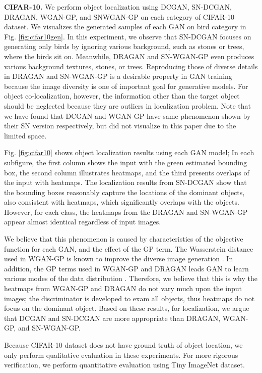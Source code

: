 \documentclass[runningheads]{llncs}
\begin{document}
\noindent\textbf{CIFAR-10.} We perform object localization using DCGAN, SN-DCGAN, DRAGAN, WGAN-GP, and SNWGAN-GP on each category of CIFAR-10 dataset. We visualizes the generated samples of each GAN on bird category in Fig. \ref{fig:cifar10gen}. In this experiment, we observe that SN-DCGAN focuses on generating only birds by ignoring various background, such as stones or trees, where the birds sit on. Meanwhile, DRAGAN and SN-WGAN-GP even produces various background textures, stones, or trees. Reproducing those of diverse details in DRAGAN and SN-WGAN-GP is a desirable property in GAN training because the image diversity is one of important goal for generative models. For object co-localization, however, the information other than the target object should be neglected because they are outliers in localization problem. Note that we have found that DCGAN and WGAN-GP have same phenomenon shown by their SN version respectively, but did not visualize in this paper due to the limited space. 

Fig. \ref{fig:cifar10} shows object localization results using each GAN model; In each subfigure, the first column shows the input with the green estimated bounding box, the second column illustrates heatmaps, and the third presents overlaps of the input with heatmaps. The localization results from SN-DCGAN show that the bounding boxes reasonably capture the locations of the dominant objects, also consistent with heatmaps, which significantly overlaps with the objects. However, for each class, the heatmaps from the DRAGAN and SN-WGAN-GP appear almost identical regardless of input images.

We believe that this phenomenon is caused by characteristics of the objective function for each GAN, and the effect of the GP term. The Wasserstein distance used in WGAN-GP is known to improve the diverse image generation \cite{arjovsky2017wasserstein}. In addition, the GP terms used in WGAN-GP and DRAGAN leads GAN to learn various modes of the data distribution \cite{fedus2017many}. Therefore, we believe that this is why the heatmaps from WGAN-GP and DRAGAN do not vary much upon the input images; the discriminator is developed to exam all objects, thus heatmaps do not focus on the dominant object. Based on these results, for localization, we argue that DCGAN and SN-DCGAN are more appropriate than DRAGAN, WGAN-GP, and SN-WGAN-GP.

Because CIFAR-10 dataset does not have ground truth of object location, we only perform qualitative evaluation in these experiments. For more rigorous verification, we perform quantitative evaluation using Tiny ImageNet dataset.
\end{document}
